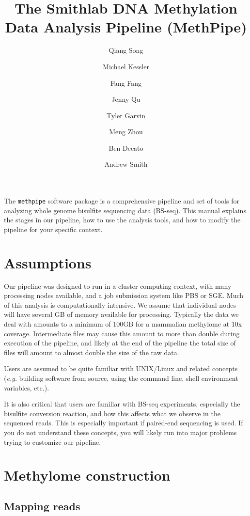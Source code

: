\documentclass[10pt]{article}
\title{The Smithlab DNA Methylation Data Analysis Pipeline (MethPipe)}
\author{Qiang Song \and Michael Kessler \and Fang Fang \and
  Jenny Qu \and Tyler Garvin \and Meng Zhou \and Ben Decato \and Andrew Smith}
\newcommand{\meth}{\texttt{methpipe}}
\begin{document}
\maketitle


The \meth{} software package is a comprehensive pipeline and set of
tools for analyzing whole genome bisulfite sequencing data
(BS-seq). This manual explains the stages in our pipeline, how to use
the analysis tools, and how to modify the pipeline for your specific
context.

\tableofcontents

\newpage


\section{Assumptions}

Our pipeline was designed to run in a cluster computing context, with
many processing nodes available, and a job submission system like PBS
or SGE. Much of this analysis is computationally intensive. We assume
that individual nodes will have several GB of memory available for
processing. Typically the data we deal with amounts to a minimum of
100GB for a mammalian methylome at 10x coverage. Intermediate files
may cause this amount to more than double during execution of the
pipeline, and likely at the end of the pipeline the total size of
files will amount to almost double the size of the raw data.

Users are assumed to be quite familiar with UNIX/Linux and related
concepts ({\em e.g.} building software from source, using the command
line, shell environment variables, etc.).

It is also critical that users are familiar with BS-seq experiments,
especially the bisulfite conversion reaction, and how this affects
what we observe in the sequenced reads. This is especially important
 if paired-end sequencing is used. If you do not understand these
 concepts, you will likely run into major problems trying to customize our pipeline.

\section{Methylome construction}

\subsection{Mapping reads}
\label{sec:mapping}
\end{document}
